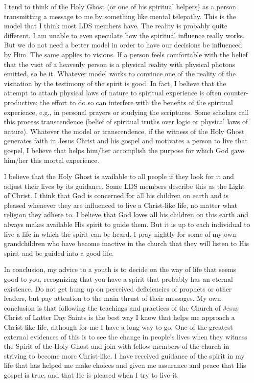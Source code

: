 			I tend to think of the Holy Ghost (or one of his spiritual helpers) as a person transmitting a message to me by something like mental telepathy. This is the model that I think most LDS members have. The reality is probably quite different. I am unable to even speculate how the spiritual influence really works. But we do not need a better model in order to have our decisions be influenced by Him. The same applies to visions. If a person feels comfortable with the belief that the visit of a heavenly person is a physical reality with physical photons emitted, so be it. Whatever model works to convince one of the reality of the visitation by the testimony of the spirit is good. In fact, I believe that the attempt to attach physical laws of nature to spiritual experience is often counter-productive; the effort to do so can interfere with the benefits of the spiritual experience, e.g., in personal prayers or studying the scriptures. Some scholars call this process transcendence (belief of spiritual truths over logic or physical laws of nature). Whatever the model or transcendence, if the witness of the Holy Ghost generates faith in Jesus Christ and his gospel and motivates a person to live that gospel, I believe that helps him/her accomplish the purpose for which God gave him/her this mortal experience.

			I believe that the Holy Ghost is available to all people if they look for it and adjust their lives by its guidance. Some LDS members describe this as the Light of Christ. I think that God is concerned for all his children on earth and is pleased whenever they are influenced to live a Christ-like life, no matter what religion they adhere to. I believe that God loves all his children on this earth and always makes available His spirit to guide them. But it is up to each individual to live a life in which the spirit can be heard. I pray nightly for some of my own grandchildren who have become inactive in the church that they will listen to His spirit and be guided into a good life.

			In conclusion, my advice to a youth is to decide on the way of life that seems good to you, recognizing that you have a spirit that probably has an eternal existence. Do not get hung up on perceived deficiencies of prophets or other leaders, but pay attention to the main thrust of their messages. My own conclusion is that following the teachings and practices of the Church of Jesus Christ of Latter Day Saints is the best way I know that helps me approach a Christ-like life, although for me I have a long way to go. One of the greatest external evidences of this is to see the change in people's lives when they witness the Spirit of the Holy Ghost and join with fellow members of the church in striving to become more Christ-like. I have received guidance of the spirit in my life that has helped me make choices and given me assurance and peace that His gospel is true, and that He is pleased when I try to live it.
			
